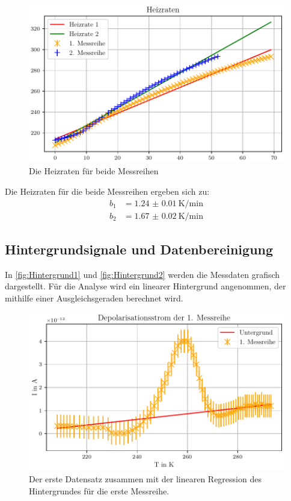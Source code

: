 \begin{figure}[H]
    \centering
    \includegraphics[width=\textwidth]{plots/A_heizraten.pdf}
    \caption{Die Heizraten für beide Messreihen}
    \label{fig:Heizraten}
\end{figure}

Die Heizraten für die beide Messreihen ergeben sich zu:
\begin{align*}
b_1 &=  \qty{1.24(1)}{\kelvin\per\minute}\\
b_2 &= \qty{1.67(2)}{\kelvin\per\minute}
\end{align*}

\subsection{Hintergrundsignale und Datenbereinigung}
In \autoref{fig:Hintergrund1} und \ref{fig:Hintergrund2} werden die Messdaten grafisch dargestellt.
Für die Analyse wird ein linearer Hintergrund angenommen, der mithilfe einer Ausgleichsgeraden berechnet wird.

\begin{figure}[H]
    \centering
    \includegraphics[width=\textwidth]{plots/B_messreihe1.pdf}
    \caption{Der erste Datensatz zusammen mit der linearen Regression des Hintergrundes für die erste Messreihe.}
    \label{fig:Hintergrund1}
\end{figure}

